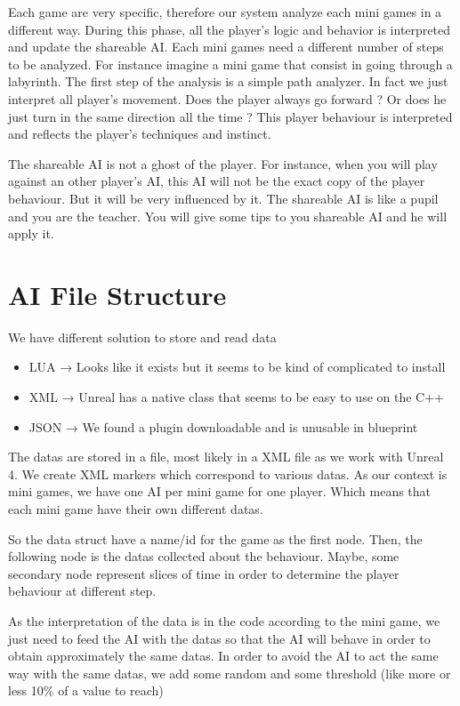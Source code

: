 \documentclass[conference]{acmsiggraph}
\begin{document}
Each game are very specific, therefore our system analyze each mini games in a different way. During this phase, all the player's logic and behavior is interpreted and update the shareable AI. Each mini games need a different number of steps to be analyzed. For instance imagine a mini game that consist in going through a labyrinth. The first step of the analysis is a simple path analyzer. In fact we just interpret all player's movement. Does the player always go forward ? Or does he just turn in the same direction all the time ? This player behaviour is interpreted and reflects the player's techniques and instinct.

The shareable AI is not a ghost of the player. For instance, when you will play against an other player's AI, this AI will not be the exact copy of the player behaviour. But it will be very influenced by it. The shareable AI is like a pupil and you are the teacher. You will give some tips to you shareable AI and he will apply it.

\section{AI File Structure}

We have different solution to store and read data
\begin{itemize}
	\item LUA → Looks like it exists but it seems to be kind of complicated to install
	\item XML → Unreal has a native class that seems to be easy to use on the C++
	\item JSON → We found a plugin downloadable and is unusable in blueprint
\end{itemize}

The datas are stored in a file, most likely in a XML file as we work with Unreal 4.
We create XML markers which correspond to various datas.
As our context is mini games, we have one AI per mini game for one player. Which means that each mini game have their own different datas.

So the data struct have a name/id for the game as the first node.
Then, the following node is the datas collected about the behaviour.
Maybe, some secondary node represent slices of time in order to determine the player behaviour at different step.

As the interpretation of the data is in the code according to the mini game, we just need to feed the AI with the datas so that the AI will behave in order to obtain approximately the same datas.
In order to avoid the AI to act the same way with the same datas, we add some random and some threshold (like more or less 10\% of a value to reach)
\end{document}
